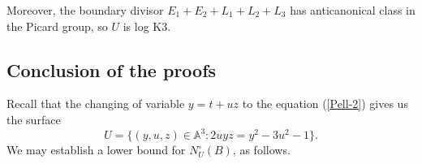 \documentclass[reqno, 11pt, twoside]{amsart}
\numberwithin{equation}{section}
\theoremstyle{definition}
\newcommand{\AAA}{\mathbb{A}}
\begin{document}
Moreover, the boundary divisor $E_1+E_2+L_1+L_2+L_3$ has anticanonical class in the Picard group, so $U$ is log K3.









\subsection{Conclusion of the proofs}

Recall that the changing of variable $y = t + u z$ to the equation (\ref{Pell-2}) gives us the surface
$$U = \{(y,u,z) \in \AAA^3: 2uyz = y^2 - 3u^2 - 1\}.$$
We may establish a lower bound for $N_U^\circ(B)$, as follows.
\end{document}

